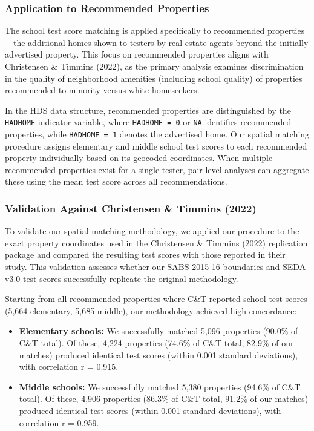 \documentclass{article}
\begin{document}
\subsubsection{Application to Recommended Properties}

The school test score matching is applied specifically to recommended properties---the additional homes shown to testers by real estate agents beyond the initially advertised property. This focus on recommended properties aligns with Christensen \& Timmins (2022), as the primary analysis examines discrimination in the quality of neighborhood amenities (including school quality) of properties recommended to minority versus white homeseekers.

In the HDS data structure, recommended properties are distinguished by the \texttt{HADHOME} indicator variable, where \texttt{HADHOME = 0} or \texttt{NA} identifies recommended properties, while \texttt{HADHOME = 1} denotes the advertised home. Our spatial matching procedure assigns elementary and middle school test scores to each recommended property individually based on its geocoded coordinates. When multiple recommended properties exist for a single tester, pair-level analyses can aggregate these using the mean test score across all recommendations.

\subsubsection{Validation Against Christensen \& Timmins (2022)}

To validate our spatial matching methodology, we applied our procedure to the exact property coordinates used in the Christensen \& Timmins (2022) replication package and compared the resulting test scores with those reported in their study. This validation assesses whether our SABS 2015-16 boundaries and SEDA v3.0 test scores successfully replicate the original methodology.

Starting from all recommended properties where C\&T reported school test scores (5,664 elementary, 5,685 middle), our methodology achieved high concordance:

\begin{itemize}
\item \textbf{Elementary schools:} We successfully matched 5,096 properties (90.0\% of C\&T total). Of these, 4,224 properties (74.6\% of C\&T total, 82.9\% of our matches) produced identical test scores (within 0.001 standard deviations), with correlation r = 0.915.
\item \textbf{Middle schools:} We successfully matched 5,380 properties (94.6\% of C\&T total). Of these, 4,906 properties (86.3\% of C\&T total, 91.2\% of our matches) produced identical test scores (within 0.001 standard deviations), with correlation r = 0.959.
\end{itemize}
\end{document}
